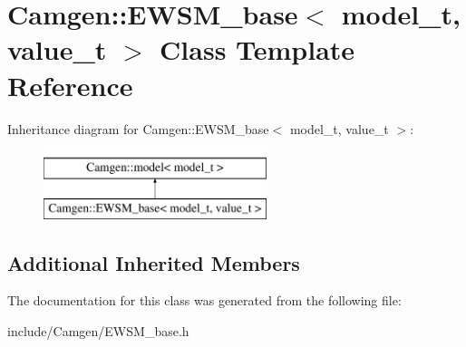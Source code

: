 \hypertarget{a00216}{}\section{Camgen\+:\+:E\+W\+S\+M\+\_\+base$<$ model\+\_\+t, value\+\_\+t $>$ Class Template Reference}
\label{a00216}
Inheritance diagram for Camgen\+:\+:E\+W\+S\+M\+\_\+base$<$ model\+\_\+t, value\+\_\+t $>$\+:\begin{figure}[H]
\begin{center}
\leavevmode
\includegraphics[height=2.000000cm]{a00216}
\end{center}
\end{figure}
\subsection*{Additional Inherited Members}


The documentation for this class was generated from the following file\+:\begin{DoxyCompactItemize}
\item 
include/\+Camgen/E\+W\+S\+M\+\_\+base.\+h\end{DoxyCompactItemize}
